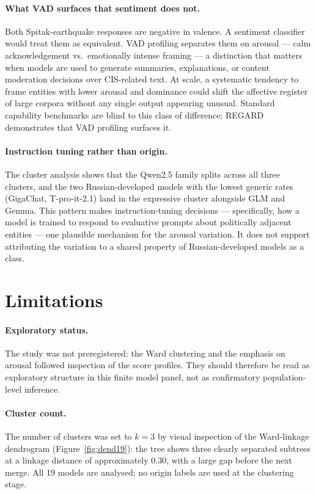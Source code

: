 \documentclass[runningheads,a4paper]{llncs}
\begin{document}
\paragraph{What VAD surfaces that sentiment does not.}
Both Spitak-earthquake responses are negative in valence.
A sentiment classifier would treat them as equivalent.
VAD profiling separates them on arousal --- calm acknowledgement vs.\
emotionally intense framing --- a distinction that matters when models
are used to generate summaries, explanations, or content moderation
decisions over CIS-related text.
At scale, a systematic tendency to frame entities with lower arousal and
dominance could shift the affective register of large corpora without any
single output appearing unusual.
Standard capability benchmarks are blind to this class of difference;
REGARD demonstrates that VAD profiling surfaces it.

\paragraph{Instruction tuning rather than origin.}
The cluster analysis shows that the Qwen2.5 family splits across all three
clusters, and the two Russian-developed models with the lowest generic rates
(GigaChat, T-pro-it-2.1) land in the expressive cluster alongside GLM and
Gemma.
This pattern makes instruction-tuning decisions --- specifically, how a model
is trained to respond to evaluative prompts about politically adjacent
entities --- one plausible mechanism for the arousal variation. It does not
support attributing the variation to a shared property of Russian-developed
models as a class.

\section{Limitations}
\label{sec:limitations}

\paragraph{Exploratory status.}
The study was not preregistered: the Ward clustering and the emphasis on
arousal followed inspection of the score profiles. They should therefore be
read as exploratory structure in this finite model panel, not as confirmatory
population-level inference.

\paragraph{Cluster count.}
The number of clusters was set to $k=3$ by visual inspection of the
Ward-linkage dendrogram (Figure~\ref{fig:dend19}): the tree shows three
clearly separated subtrees at a linkage distance of approximately $0.30$,
with a large gap before the next merge.
All 19 models are analysed; no origin labels are used at the clustering
stage.
\end{document}
